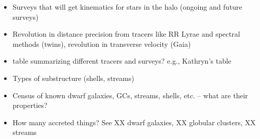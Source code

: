 \begin{itemize}
	\item Surveys that will get kinematics for stars in the halo (ongoing and future surveys)
	\item Revolution in distance precision from tracers like RR Lyrae and spectral methods (twins), revolution in transverse velocity (Gaia)
	\item table summarizing different tracers and surveys? e.g., Kathryn's table
	\item Types of substructure (shells, streams)
	\item Census of known dwarf galaxies, GCs, streams, shells, etc. -- what are their properties?
	\item How many accreted things? See XX dwarf galaxies, XX globular clusters, XX streams
\end{itemize}


